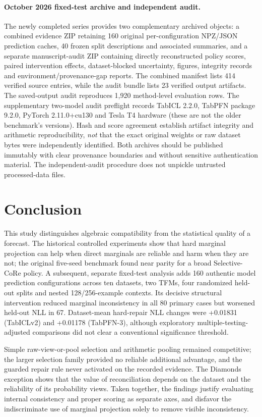 \documentclass[a4paper,fleqn]{cas-sc}
\begin{document}
\paragraph{October 2026 fixed-test archive and independent audit.}
The newly completed series provides two complementary archived objects: a combined evidence ZIP retaining 160 original per-configuration NPZ/JSON prediction caches, 40 frozen split descriptions and associated summaries, and a separate manuscript-audit ZIP containing directly reconstructed policy scores, paired intervention effects, dataset-blocked uncertainty, figures, integrity records and environment/provenance-gap reports. The combined manifest lists 414 verified source entries, while the audit bundle lists 23 verified output artifacts. The saved-output audit reproduces 1,920 method-level evaluation rows. The supplementary two-model audit preflight records TabICL 2.2.0, TabPFN package 9.2.0, PyTorch 2.11.0+cu130 and Tesla T4 hardware (these are not the older benchmark's versions). Hash and score agreement establish artifact integrity and arithmetic reproducibility, \emph{not} that the exact original weights or raw dataset bytes were independently identified. Both archives should be published immutably with clear provenance boundaries and without sensitive authentication material. The independent-audit procedure does not unpickle untrusted processed-data files.

\section{Conclusion}
This study distinguishes algebraic compatibility from the statistical quality of a forecast. The historical controlled experiments show that hard marginal projection can help when direct marginals are reliable and harm when they are not; the original five-seed benchmark found near parity for a broad Selective-CoRe policy. A subsequent, separate fixed-test analysis adds 160 authentic model prediction configurations across ten datasets, two TFMs, four randomized held-out splits and nested 128/256-example contexts. Its decisive structural intervention reduced marginal inconsistency in all 80 primary cases but worsened held-out NLL in 67. Dataset-mean hard-repair NLL changes were +0.01831 (TabICLv2) and +0.01178 (TabPFN-3), although exploratory multiple-testing-adjusted comparisons did not clear a conventional significance threshold.

Simple raw-view-or-pool selection and arithmetic pooling remained competitive; the larger selection family provided no reliable additional advantage, and the guarded repair rule never activated on the recorded evidence. The Diamonds exception shows that the value of reconciliation depends on the dataset and the reliability of its probability views. Taken together, the findings justify evaluating internal consistency and proper scoring as separate axes, and disfavor the indiscriminate use of marginal projection solely to remove visible inconsistency.
\end{document}
